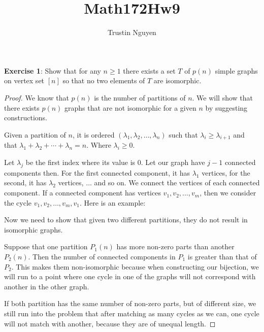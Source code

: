 \documentclass{article}
\title{Math172Hw9}
\author{Trustin Nguyen}
\begin{document}
    \maketitle

\reversemarginpar

\textbf{Exercise 1}: Show that for any $n \geq 1$ there exists a set $T$ of $p(n)$ simple graphs on vertex set $[n]$ so that no two elements of $T$ are isomorphic.
    \begin{proof}
        We know that $p(n)$ is the number of partitions of $n$. We will show that there exists $p(n)$ graphs that are not isomorphic for a given $n$ by suggesting constructions. 

        Given a partition of $n$, it is ordered $(\lambda_{1}, \lambda_{2}, \ldots, \lambda_{n})$ such that $\lambda_{i}  \geq \lambda_{i + 1}$ and that $\lambda_{1} + \lambda_{2} + \cdots + \lambda_{n} = n$. Where $\lambda_{i} \geq 0$.

        Let $\lambda_{j}$ be the first index where its value is $0$. Let our graph have $j - 1$ connected components then. For the first connected component, it has $\lambda_{1}$ vertices, for the second, it has $\lambda_{2}$ vertices, $\ldots$ and so on. We connect the vertices of each connected component. If a connected component has vertices $v_{1}, v_{2}, \ldots, v_{m}$, then we consider the cycle $v_{1}, v_{2}, \ldots, v_{m}, v_{1}$. Here is an example:
            \begin{fixedfigure}
            \end{fixedfigure}
        Now we need to show that given two different partitions, they do not result in isomorphic graphs. 

        Suppose that one partition $P_{1}(n)$ has more non-zero parts than another $P_{2}(n)$. Then the number of connected components in $P_{1}$ is greater than that of $P_{2}$. This makes them non-isomorphic because when constructing our bijection, we will run to a point where one cycle in one of the graphs will not correspond with another in the other graph.

        If both partition has the same number of non-zero parts, but of different size, we still run into the problem that after matching as many cycles as we can, one cycle will not match with another, because they are of unequal length.
    \end{proof}
\end{document}
